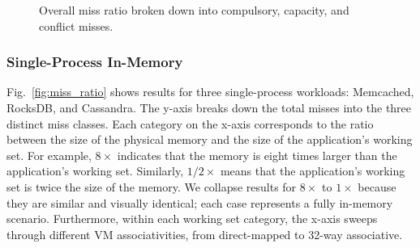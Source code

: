 \begin{figure}[t]
	\centering
	
	
	
	\caption{Overall miss ratio broken down into compulsory, capacity, and conflict misses.
		\label{fig:miss_ratio_procs}}
\end{figure}

\subsubsection{Single-Process In-Memory}

Fig.~\ref{fig:miss_ratio} shows results for three single-process workloads: Memcached, RocksDB, and Cassandra. The y-axis breaks down the total misses into the three distinct miss classes. Each category on the x-axis corresponds to the ratio between the size of the physical memory and the size of the application's working set. For example,  $8\times$ indicates that the memory is eight times larger than the application's working set. Similarly, $1/2\times$ means that the application's working set is twice the size of the memory. We collapse results for $8\times$ to $1\times$ because they are similar and visually identical; each case represents a fully in-memory scenario. Furthermore, within each working set category, the x-axis sweeps through different VM associativities, from direct-mapped to 32-way associative. 


